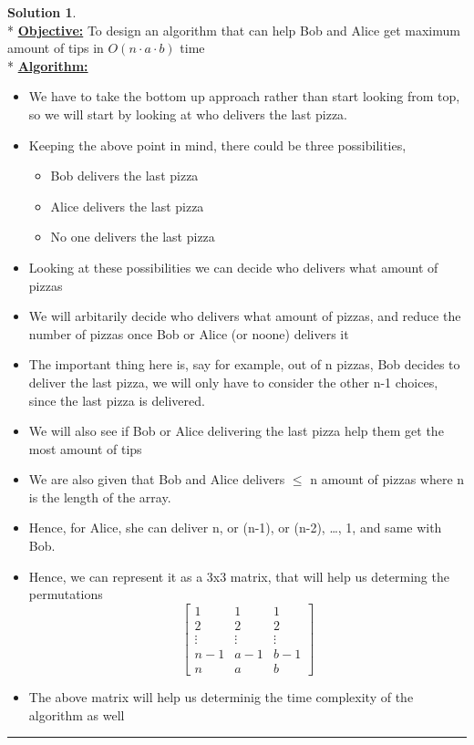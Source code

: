 \documentclass{article}
\theoremstyle{definition}
\def\fline{\rule{0.75\linewidth}{0.5pt}}
\newcommand{\finishline}{\vspace{-15pt}\begin{center}\fline\end{center}}
\newtheorem*{solution*}{Solution}
\newenvironment{solution}{\begin{solution*}}{{\finishline} \end{solution*}}
\begin{document}
\begin{solution}
	\hfill \bigskip\\*
	\textbf{\underline{Objective:}} To design an algorithm that can help Bob and Alice get maximum amount of tips in $O(n \cdot a \cdot b)$ time \bigskip\\*
	\textbf{\underline{Algorithm:}}
	\begin{itemize}
		\item We have to take the bottom up approach rather than start looking from top, so we will start by looking at who delivers the last pizza.
		\item Keeping the above point in mind, there could be three possibilities,
		\begin{itemize}
			\item Bob delivers the last pizza
			\item Alice delivers the last pizza
			\item No one delivers the last pizza
		\end{itemize}
		\item Looking at these possibilities we can decide who delivers what amount of pizzas
		\item We will arbitarily decide who delivers what amount of pizzas, and reduce the number of pizzas once Bob or Alice (or noone) delivers it
		\item The important thing here is, say for example, out of n pizzas, Bob decides to deliver the last pizza, we will only have to consider the other n-1 choices, since the last pizza is delivered.
		\item We will also see if Bob or Alice delivering the last pizza help them get the most amount of tips
		\item We are also given that Bob and Alice delivers $\leq$ n amount of pizzas where n is the length of the array.
		\item Hence, for Alice, she can deliver n, or (n-1), or (n-2), \ldots, 1, and same with Bob.
		\item Hence, we can represent it as a 3x3 matrix, that will help us determing the permutations
		\[
			\begin{bmatrix}
			    1       & 1 & 1  \\
			    2       &  2&  2 \\
			   \vdots &\vdots &\vdots \\
			   n-1    &a-1 &b-1 \\
			    n       & a & b
			\end{bmatrix}
		\]
		\item The above matrix will help us determinig the time complexity of the algorithm as well

\end{itemize}
\end{solution}
\end{document}
